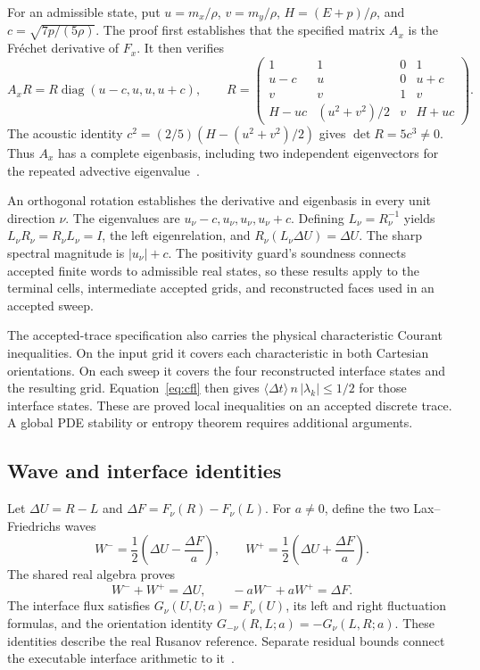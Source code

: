\documentclass[11pt]{article}
\newcommand{\val}[1]{\langle #1\rangle}
\begin{document}
For an admissible state, put $u=m_x/\rho$, $v=m_y/\rho$, $H=(E+p)/\rho$, and $c=\sqrt{7p/(5\rho)}$.  The proof first establishes that the specified matrix $A_x$ is the Fr\'echet derivative of $F_x$.  It then verifies
\begin{equation}
A_xR=R\operatorname{diag}(u-c,u,u,u+c),\qquad
R=\begin{pmatrix}
1&1&0&1\\
u-c&u&0&u+c\\
v&v&1&v\\
H-uc&(u^2+v^2)/2&v&H+uc
\end{pmatrix}.
\end{equation}
The acoustic identity $c^2=(2/5)(H-(u^2+v^2)/2)$ gives $\det R=5c^3\ne0$.  Thus $A_x$ has a complete eigenbasis, including two independent eigenvectors for the repeated advective eigenvalue~\cite{hyperbolicity}.

An orthogonal rotation establishes the derivative and eigenbasis in every unit direction $\nu$.  The eigenvalues are $u_\nu-c,u_\nu,u_\nu,u_\nu+c$.  Defining $L_\nu=R_\nu^{-1}$ yields $L_\nu R_\nu=R_\nu L_\nu=I$, the left eigenrelation, and $R_\nu(L_\nu\Delta U)=\Delta U$.  The sharp spectral magnitude is $|u_\nu|+c$.  The positivity guard's soundness connects accepted finite words to admissible real states, so these results apply to the terminal cells, intermediate accepted grids, and reconstructed faces used in an accepted sweep.

The accepted-trace specification also carries the physical characteristic Courant inequalities.  On the input grid it covers each characteristic in both Cartesian orientations.  On each sweep it covers the four reconstructed interface states and the resulting grid.  Equation~\eqref{eq:cfl} then gives $\val{\Delta t}\,n\,|\lambda_k|\leq1/2$ for those interface states.  These are proved local inequalities on an accepted discrete trace.  A global PDE stability or entropy theorem requires additional arguments.

\subsection{Wave and interface identities}

Let $\Delta U=R-L$ and $\Delta F=F_\nu(R)-F_\nu(L)$.  For $a\ne0$, define the two Lax--Friedrichs waves
\begin{equation}
W^- =\frac12\left(\Delta U-\frac{\Delta F}{a}\right),\qquad
W^+ =\frac12\left(\Delta U+\frac{\Delta F}{a}\right).
\end{equation}
The shared real algebra proves
\begin{equation}
W^-+W^+=\Delta U,\qquad -aW^-+aW^+=\Delta F.
\end{equation}
The interface flux satisfies $G_\nu(U,U;a)=F_\nu(U)$, its left and right fluctuation formulas, and the orientation identity $G_{-\nu}(R,L;a)=-G_\nu(L,R;a)$.  These identities describe the real Rusanov reference.  Separate residual bounds connect the executable interface arithmetic to it~\cite{waves}.
\end{document}
